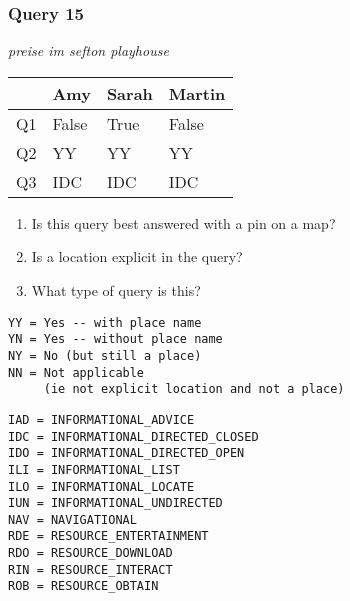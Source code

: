 \begin{frame}[fragile]
\frametitle{Query 15}
\vspace{1em}

\emph{preise im sefton playhouse}

\vfill

\begin{table}
  \centering
  \begin{tabular}{ l l l l }
    & \textbf{Amy} & \textbf{Sarah} & \textbf{Martin}\\
    \toprule
    Q1 & False & True & False\\
Q2 & YY & YY & YY\\
Q3 & IDC & IDC & IDC\\
    \bottomrule
  \end{tabular}
\end{table}

\vfill

\tiny{

\begin{enumerate}
\item Is this query best answered with a pin on a map?
\item Is a location explicit in the query?
\item What type of query is this?
\end{enumerate}

\vfill

\begin{multicols}{2}
\begin{verbatim}
YY = Yes -- with place name
YN = Yes -- without place name
NY = No (but still a place)
NN = Not applicable 
     (ie not explicit location and not a place)
\end{verbatim}

\columnbreak
\begin{verbatim}
IAD = INFORMATIONAL_ADVICE
IDC = INFORMATIONAL_DIRECTED_CLOSED
IDO = INFORMATIONAL_DIRECTED_OPEN
ILI = INFORMATIONAL_LIST
ILO = INFORMATIONAL_LOCATE
IUN = INFORMATIONAL_UNDIRECTED
NAV = NAVIGATIONAL
RDE = RESOURCE_ENTERTAINMENT
RDO = RESOURCE_DOWNLOAD
RIN = RESOURCE_INTERACT
ROB = RESOURCE_OBTAIN
\end{verbatim}
\end{multicols}
}

\end{frame}


